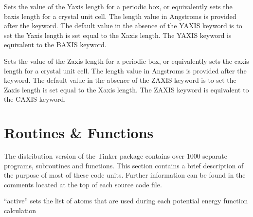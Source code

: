 \documentclass[letterpaper,11pt,english]{sphinxmanual}
\begin{document}
\ignorespaces {}\label{\detokenize{text/keywords:key-y-axis}}\begin{description}
\sphinxAtStartPar
Sets the value of the Y\sphinxhyphen{}axis length for a periodic box, or equivalently sets the b\sphinxhyphen{}axis length for a crystal unit cell. The length value in Angstroms is provided after the keyword. The default value in the absence of the Y\sphinxhyphen{}AXIS keyword is to set the Y\sphinxhyphen{}axis length is set equal to the X\sphinxhyphen{}axis length. The Y\sphinxhyphen{}AXIS keyword is equivalent to the B\sphinxhyphen{}AXIS keyword.

\end{description}

\ignorespaces {}\label{\detokenize{text/keywords:key-z-axis}}\begin{description}
\sphinxAtStartPar
Sets the value of the Z\sphinxhyphen{}axis length for a periodic box, or equivalently sets the c\sphinxhyphen{}axis length for a crystal unit cell. The length value in Angstroms is provided after the keyword. The default value in the absence of the Z\sphinxhyphen{}AXIS keyword is to set the Z\sphinxhyphen{}axis length is set equal to the X\sphinxhyphen{}axis length. The Z\sphinxhyphen{}AXIS keyword is equivalent to the C\sphinxhyphen{}AXIS keyword.

\end{description}

\sphinxstepscope


\chapter{Routines \& Functions}
\label{\detokenize{text/routines:routines-functions}}\label{\detokenize{text/routines::doc}}
\sphinxAtStartPar
The distribution version of the Tinker package contains over 1000 separate programs, subroutines and functions. This section contains a brief description of the purpose of most of these code units. Further information can be found in the comments located at the top of each source code file.

\sphinxAtStartPar
{}

\sphinxAtStartPar
“active” sets the list of atoms that are used during each potential energy function calculation
\end{document}
